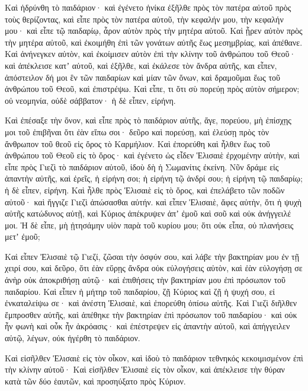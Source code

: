 {\par }{\PP {}Καὶ ἡδρύνθη τὸ παιδάριον· καὶ ἐγένετο ἡνίκα ἐξῆλθε πρὸς τὸν πατέρα αὐτοῦ πρὸς τοὺς θερίζοντας,
καὶ εἶπε πρὸς τὸν πατέρα αὐτοῦ, τὴν κεφαλήν μου, τὴν κεφαλήν μου· καὶ εἶπε τῷ παιδαρίῳ, ἆρον αὐτὸν πρὸς τὴν μητέρα αὐτοῦ.
Καὶ ᾖρεν αὐτὸν πρὸς τὴν μητέρα αὐτοῦ, καὶ ἐκοιμήθη ἐπὶ τῶν γονάτων αὐτῆς ἕως μεσημβρίας, καὶ ἀπέθανε.
Καὶ ἀνήνεγκεν αὐτὸν, καὶ ἐκοίμισεν αὐτὸν ἐπὶ τὴν κλίνην τοῦ ἀνθρώπου τοῦ Θεοῦ· καὶ ἀπέκλεισε κατʼ αὐτοῦ, καὶ ἐξῆλθε,
καὶ ἐκάλεσε τὸν ἄνδρα αὐτῆς, και εἶπεν, ἀπόστειλον δή μοι ἓν τῶν παιδαρίων καὶ μίαν τῶν ὄνων, καὶ δραμοῦμαι ἕως τοῦ ἀνθρώπου τοῦ Θεοῦ, καὶ ἐπιστρέψω.
Καὶ εἶπε, τι ὅτι σὺ πορεύῃ πρὸς αὐτὸν σήμερον; οὐ νεομηνία, οὐδὲ σάββατον· ἡ δὲ εἶπεν, εἰρήνη.
\par }{\PP {}Καὶ ἐπέσαξε τὴν ὄνον, καὶ εἶπε πρὸς τὸ παιδάριον αὐτῆς, ἄγε, πορεύου, μὴ ἐπίσχῃς μοι τοῦ ἐπιβῆναι ὅτι ἐὰν εἴπω σοι· δεῦρο καὶ πορεύσῃ, καὶ ἐλεύσῃ πρὸς τὸν ἄνθρωπον τοῦ θεοῦ εἰς ὄρος τὸ Καρμήλιον.
Καὶ ἐπορεύθη καὶ ἦλθεν ἕως τοῦ ἀνθρώπου τοῦ Θεοῦ εἰς τὸ ὄρος· καὶ ἐγένετο ὡς εἶδεν Ἑλισαιὲ ἐρχομένην αὐτὴν, καὶ εἶπε πρὸς Γιεζὶ τὸ παιδάριον αὐτοῦ, ἰδοὺ δὴ ἡ Σωμανίτις ἐκείνη.
Νῦν δράμε εἰς ἀπαντὴν αὐτῆς, καὶ ἐρεῖς, ἡ εἰρήνη σοι; ἡ εἰρήνη τῷ ἀνδρί σου; ἡ εἰρήνη τῷ παιδαρίῳ; ἡ δὲ εἶπεν, εἰρήνη.
Καὶ ἦλθε πρὸς Ἑλισαιὲ εἰς τὸ ὄρος, καὶ ἐπελάβετο τῶν ποδῶν αὐτοῦ· καὶ ἤγγιζε Γιεζὶ ἀπώσασθαι αὐτήν. καὶ εἶπεν Ἑλισαιὲ, ἄφες αὐτὴν, ὅτι ἡ ψυχὴ αὐτῆς κατώδυνος αὐτῇ, καὶ Κύριος ἀπέκρυψεν ἀπʼ ἐμοῦ καὶ σοῦ καὶ οὐκ ἀνήγγειλέ μοι.
Ἡ δὲ εἶπε, μὴ ᾐτησάμην υἱὸν παρὰ τοῦ κυρίου μου; ὅτι οὐκ εἶπα, οὐ πλανήσεις μετʼ ἐμοῦ;
\par }{\PP {}Καὶ εἶπεν Ἐλισαιὲ τῷ Γιεζί, ζῶσαι τὴν ὀσφύν σου, καὶ λάβε τὴν βακτηρίαν μου ἐν τῇ χειρί σου, καὶ δεῦρο, ὅτι ἐὰν εὕρῃς ἄνδρα οὐκ εὐλογήσεις αὐτὸν, καὶ ἐὰν εὐλογήσῃ σε ἀνὴρ οὐκ ἀποκριθήσῃ αὐτῷ· καὶ ἐπιθήσεις τὴν βακτηρίαν μου ἐπὶ πρόσωπον τοῦ παιδαρίου.
Καὶ εἶπεν ἡ μήτηρ τοῦ παιδαρίου, ζῇ Κύριος καὶ ζῇ ἡ ψυχή σου, εἰ ἐνκαταλείψω σε· καὶ ἀνέστη Ἑλισαιὲ, καὶ ἐπορεύθη ὀπίσω αὐτῆς.
Καὶ Γιεζὶ διῆλθεν ἔμπροσθεν αὐτῆς, καὶ ἀπέθηκε τὴν βακτηρίαν ἐπὶ πρόσωπον τοῦ παιδαρίου· καὶ οὐκ ἦν φωνὴ καὶ οὖκ ἦν ἀκρόασις· καὶ ἐπέστρεψεν εἰς ἀπαντὴν αὐτοῦ, καὶ ἀπήγγειλεν αὐτῷ, λέγων, οὐκ ἠγέρθη τὸ παιδάριον.
\par }{\PP {}Καὶ εἰσῆλθεν Ἑλισαιὲ εἰς τὸν οἶκον, καὶ ἰδοὺ τὸ παιδάριον τεθνηκός κεκοιμισμένον ἐπὶ τὴν κλίνην αὐτοῦ·
Καὶ εἰσῆλθεν Ἑλισαιὲ εἰς τὸν οἶκον, καὶ ἀπέκλεισε τὴν θύραν κατὰ τῶν δύο ἑαυτῶν, καὶ προσηύξατο πρὸς Κύριον.
}
